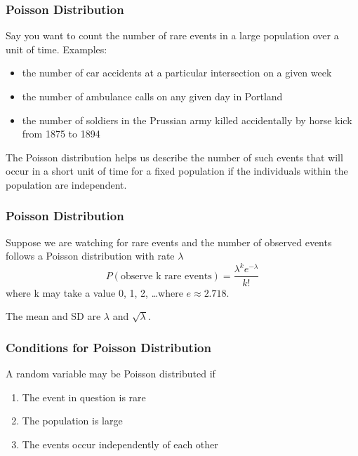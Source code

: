 \documentclass[handout]{beamer}
\newcommand{\blue}[1]{\textcolor{blue2}{#1}}
\begin{document}
\begin{frame}
\frametitle{Poisson Distribution}

Say you want to count the number of rare events in a large population over a unit of time.  Examples:
\begin{itemize}
\pause \item the number of car accidents at a particular intersection on a given week
\pause \item the number of ambulance calls on any given day in Portland
\pause \item the number of soldiers in the Prussian army killed accidentally by horse kick from 1875 to 1894
\end{itemize}

\vskip 0.25cm

\pause The \blue{Poisson distribution} helps us describe the number of such events that will occur in a short unit of time for a fixed population if the individuals within the population are
independent.

\end{frame}


\begin{frame}
\frametitle{Poisson Distribution}
Suppose we are watching for rare events and the number of observed events follows a Poisson distribution with rate $\lambda$
\[
    P(\mbox{observe k rare events}) = \frac{\lambda^k e^{-\lambda}}{k!}
\]
\pause where k may take a value 0, 1, 2, \ldots where $e \approx 2.718$.

\vspace{0.5cm}

\pause The mean and SD are $\lambda$ and $\sqrt{\lambda}$.

\end{frame}


\begin{frame}
\frametitle{Conditions for Poisson Distribution}
A random variable \blue{may} be Poisson distributed if

\begin{enumerate}
\pause\item The event in question is rare
\pause\item The population is large
\pause\item The events occur independently of each other
\end{enumerate}

\end{frame}
\end{document}

